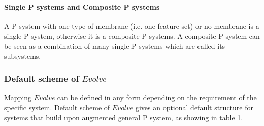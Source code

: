 \documentclass[9pt,a4paper,twoside]{article}
\begin{document}
            \paragraph{Single P systems and Composite P systems}
            A P system with one type of membrane (i.e. one feature set) or no membrane is a single P system, otherwise it is a composite P systems. A composite P system can be seen as a combination of many single P systems which are called its subsystems.
        
            \subsubsection{Default scheme of $Evolve$}
                Mapping $Evolve$ can be defined in any form depending on the requirement of the specific system. Default scheme of $Evolve$ gives an optional default structure for systems that build upon augmented general P system, as showing in table 1.
\end{document}

